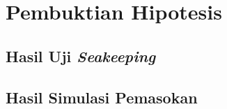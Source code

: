 \section{Pembuktian Hipotesis}
\label{sec:bukti-hipotesis}



\subsection{Hasil Uji \emph{Seakeeping}}
\label{subsec:hasil-uji-seakeeping}



\subsection{Hasil Simulasi Pemasokan}
\label{subsec:simul-existing}